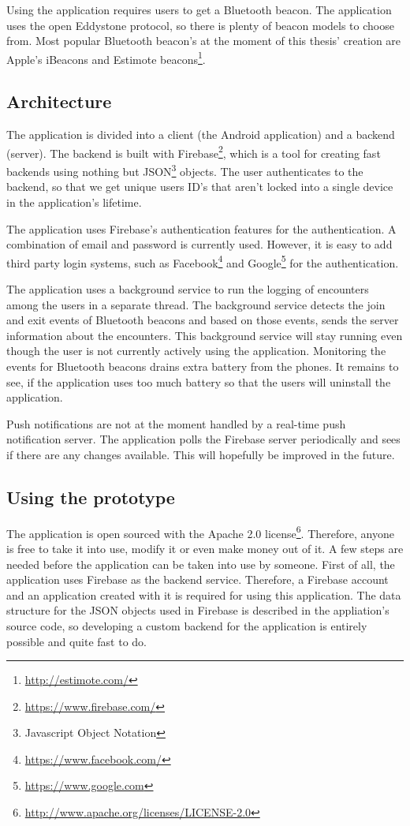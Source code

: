 Using the application requires users to get a Bluetooth beacon. The application uses the open  Eddystone protocol, so there is plenty of beacon models to choose from. Most popular Bluetooth beacon's at the moment of this thesis' creation are Apple's iBeacons and Estimote beacons\footnote{\url{http://estimote.com/}}.

\subsection{Architecture}

The application is divided into a client (the Android application) and a backend (server). The backend is built with Firebase\footnote{\url{https://www.firebase.com/}}, which is a tool for creating fast backends using nothing but JSON\footnote{Javascript Object Notation} objects. The user authenticates to the backend, so that we get unique users ID's that aren't locked into a single device in the application's lifetime.

The application uses Firebase's authentication features for the authentication. A combination of email and password is currently used. However, it is easy to add third party login systems, such as Facebook\footnote{\url{https://www.facebook.com/}} and Google\footnote{\url{https://www.google.com}} for the authentication.

The application uses a background service to run the logging of encounters among the users in a separate thread. The background service detects the join and exit events of Bluetooth beacons and based on those events, sends the server information about the encounters. This background service will stay running even though the user is not currently actively using the application. Monitoring the events for Bluetooth beacons drains extra battery from the phones. It remains to see, if the application uses too much battery so that the users will uninstall the application.

Push notifications are not at the moment handled by a real-time push notification server. The application polls the Firebase server periodically and sees if there are any changes available. This will hopefully be improved in the future.

\subsection{Using the prototype}

The application is open sourced with the Apache 2.0 license\footnote{\url{http://www.apache.org/licenses/LICENSE-2.0}}. Therefore, anyone is free to take it into use, modify it or even make money out of it. A few steps are needed before the application can be taken into use by someone. First of all, the application uses Firebase as the backend service. Therefore, a Firebase account and an application created with it is required for using this application. The data structure for the JSON objects used in Firebase is described in the appliation's source code, so developing a custom backend for the application is entirely possible and quite fast to do.

